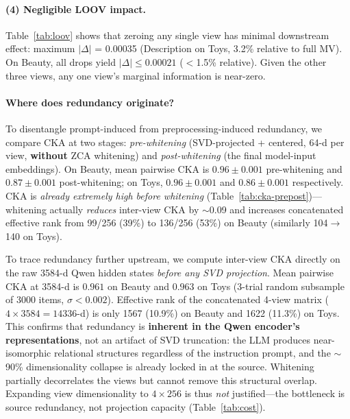 \documentclass[sigconf,natbib=true,anonymous]{acmart}
\begin{document}
\paragraph{(4) Negligible LOOV impact.}
Table~\ref{tab:loov} shows that zeroing any single view has minimal downstream effect: maximum $|\Delta|$ = 0.00035 (Description on Toys, 3.2\% relative to full MV).
On Beauty, all drops yield $|\Delta| \le 0.00021$ ($<$1.5\% relative).
Given the other three views, any one view's marginal information is near-zero.

\paragraph{Where does redundancy originate?}
To disentangle prompt-induced from preprocessing-induced redundancy, we compare CKA at two stages: \emph{pre-whitening} (SVD-projected + centered, 64-d per view, \textbf{without} ZCA whitening) and \emph{post-whitening} (the final model-input embeddings).
On Beauty, mean pairwise CKA is $0.96\pm0.001$ pre-whitening and $0.87\pm0.001$ post-whitening; on Toys, $0.96\pm0.001$ and $0.86\pm0.001$ respectively.
CKA is \emph{already extremely high before whitening} (Table~\ref{tab:cka-prepost})---whitening actually \emph{reduces} inter-view CKA by $\sim$0.09 and increases concatenated effective rank from 99/256 (39\%) to 136/256 (53\%) on Beauty (similarly 104$\to$140 on Toys).

To trace redundancy further upstream, we compute inter-view CKA directly on the raw 3584-d Qwen hidden states \emph{before any SVD projection}.
Mean pairwise CKA at 3584-d is $0.961$ on Beauty and $0.963$ on Toys (3-trial random subsample of 3000 items, $\sigma < 0.002$).
Effective rank of the concatenated 4-view matrix ($4\times 3584 = 14336$-d) is only 1567 (10.9\%) on Beauty and 1622 (11.3\%) on Toys.
This confirms that redundancy is \textbf{inherent in the Qwen encoder's representations}, not an artifact of SVD truncation: the LLM produces near-isomorphic relational structures regardless of the instruction prompt, and the $\sim$90\% dimensionality collapse is already locked in at the source.
Whitening partially decorrelates the views but cannot remove this structural overlap.
Expanding view dimensionality to $4\times256$ is thus \emph{not} justified---the bottleneck is source redundancy, not projection capacity (Table~\ref{tab:cost}).
\end{document}
